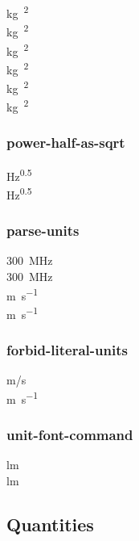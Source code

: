 \documentclass{article}
\begin{document}
\unit[qualifier-mode = bracket]{\kilogram\polymer\squared} \\  %
\unit[qualifier-mode = brackets]{\kilogram\polymer\squared} \\  %
\unit[qualifier-mode = phrase, qualifier-phrase = {\;}]{\kilogram\polymer\squared} \\ %
\unit[qualifier-mode = space]{\kilogram\polymer\squared} \\ %
\unit[qualifier-mode = combine]{\kilogram\polymer\squared} \\ %
\unit[qualifier-mode = text]{\kilogram\polymer\squared}  %

\subsubsection{power-half-as-sqrt}
\unit{\Hz\tothe{0.5}} \\
\unit[power-half-as-sqrt]{\Hz\tothe{0.5}}

\subsubsection{parse-units}
\qty{300}{\MHz} \\
\qty[parse-units = false]{300}{\MHz} \\
\unit{\meter\per\second} \\
\unit[parse-units=false]{\meter\per\second}

\subsubsection{forbid-literal-units}
\unit{m/s}\\
\unit[forbid-literal-units]{\meter\per\second}

\subsubsection{unit-font-command} %
\unit{\lumen} \\
\unit[unit-font-command = \mathit]{\lumen}

\subsection{Quantities}
\end{document}
